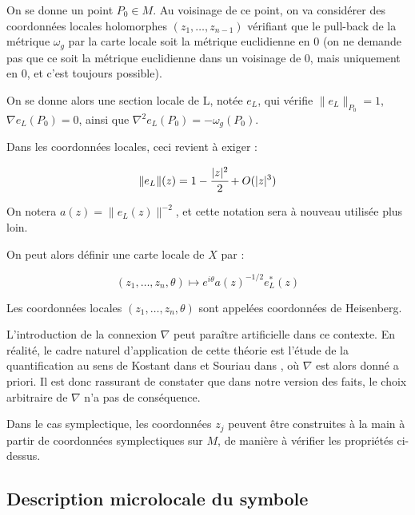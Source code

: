 On se donne un point $P_0 \in M$. Au voisinage de ce point, on va considérer des coordonnées locales holomorphes $(z_1,\ldots, z_{n-1})$ vérifiant que le pull-back de la métrique $\omega_g$ par la carte locale soit la métrique euclidienne en 0 (on ne demande pas que ce soit la métrique euclidienne dans un voisinage de 0, mais uniquement en 0, et c'est toujours possible).

On se donne alors une section locale de L, notée $e_L$, qui vérifie $\|e_L\|_{P_0}=1$, $\nabla e_L(P_0)=0$, ainsi que $\nabla^2e_L(P_0)=-\omega_g(P_0)$.

Dans les coordonnées locales, ceci revient à exiger :

\begin{equation*}
\|e_L\|(z)=1-\cfrac{|z|^2}{2} + O(|z|^3)
\end{equation*}

On notera $a(z)=\|e_L(z)\|^{-2}$, et cette notation sera à nouveau utilisée plus loin.

On peut alors définir une carte locale de $X$ par :

\begin{equation*}
(z_1, \ldots, z_n, \theta) \mapsto e^{i\theta}a(z)^{-1/2}e_L^*(z)
\end{equation*}

Les coordonnées locales $(z_1, \ldots, z_n, \theta)$ sont appelées coordonnées de Heisenberg.

\begin{rem}L'introduction de la connexion $\nabla$ peut paraître artificielle dans ce contexte. En réalité, le cadre naturel d'application de cette théorie est l'étude de la quantification au sens de Kostant dans \cite{kostant1970quantization} et Souriau dans \cite{souriau1967quantification}, où $\nabla$ est alors donné a priori. Il est donc rassurant de constater que dans notre version des faits, le choix arbitraire de $\nabla$ n'a pas de conséquence.\end{rem}
\begin{rem}Dans le cas symplectique, les coordonnées $z_j$ peuvent être construites à la main à partir de coordonnées symplectiques sur $M$, de manière à vérifier les propriétés ci-dessus. \end{rem}

\chantier

\subsection{Description microlocale du symbole}

